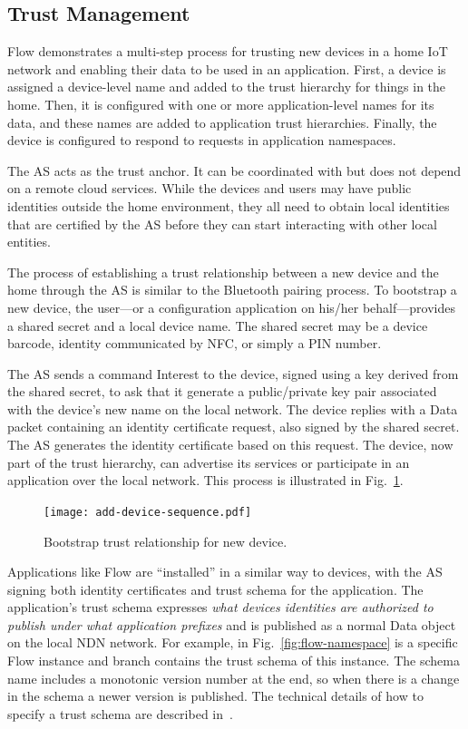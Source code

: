 \subsection{Trust Management}
\label{sec:trust-management}

Flow demonstrates a multi-step process for trusting new devices in a home IoT network and enabling their data to be used in an application. 
First, a device is assigned a device-level name and added to the trust hierarchy for things in the home. 
Then, it is configured with one or more application-level names for its data, and these names are added to application trust hierarchies. 
Finally, the device is configured to respond to requests in application namespaces. 

The AS acts as the trust anchor. 
It can be coordinated with but does not depend on a remote cloud services.
While the devices and users may have public identities outside the home environment, they all need to obtain local identities that are certified by the AS before they can start interacting with other local entities.

The process of establishing a trust relationship between a new device and the home through the AS is similar to the Bluetooth pairing process.
To bootstrap a new device, the user---or a configuration application on his/her behalf---provides a shared secret and a local device name.
The shared secret may be a device barcode, identity communicated by NFC, or simply a PIN number. 

The AS sends a command Interest to the device, signed using a key derived from the shared secret, to ask that it generate a public/private key pair associated with the device's new name on the local network.
The device replies with a Data packet containing an identity certificate request, also signed by the shared secret.
The AS generates the identity certificate based on this request.
The device, now part of the trust hierarchy, can advertise its services or participate in an application over the local network.
This process is illustrated in Fig.~\ref{fig:flow-bootstrap}.

\begin{figure}[!t]
\centering
\texttt{[image: add-device-sequence.pdf]}
\caption{Bootstrap trust relationship for new device.}
\label{fig:flow-bootstrap}
\end{figure}

Applications like Flow are ``installed'' in a similar way to devices, with the AS signing both identity certificates and trust schema for the application.
The application's trust schema expresses \textit{what devices identities are authorized to publish under what application prefixes} and is published as a normal Data object on the local NDN network. 
For example, in Fig.~\ref{fig:flow-namespace}  is a specific Flow instance and  branch contains the trust schema of this instance.
The schema name includes a monotonic version number at the end, so when there is a change in the schema a newer version is published.
The technical details of how to specify a trust schema are described in~\cite{trust-schema}.

